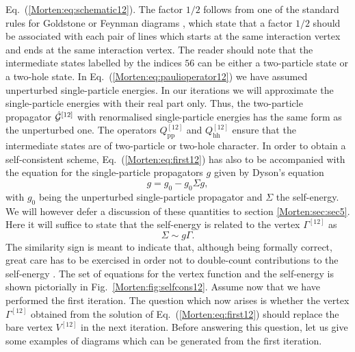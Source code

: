 Eq.~(\ref{Morten:eq:schematic12}).  The factor $1/2$ follows from one
of the standard rules for Goldstone or Feynman  
diagrams
\cite{Morten:kstop81}, which state that a factor $1/2$ should be
associated with each pair of lines which starts at the same
interaction vertex and ends at the same interaction vertex.  The
reader should note that the intermediate states labelled by the
indices $56$ can be either a two-particle state or a two-hole state.
In Eq.~(\ref{Morten:eq:paulioperator12}) we have assumed unperturbed
single-particle energies.  In our iterations we will approximate the
single-particle energies with their real part only. Thus, the
two-particle propagator $\hat{{\cal G}}^{[12]}$ with renormalised
single-particle energies has the same form as the unperturbed one.
The operators $Q^{[12]}_{\mathrm{pp}}$ and $Q^{[12]}_{\mathrm{hh}}$
ensure that the intermediate states are of two-particle or two-hole
character.  In order to obtain a self-consistent scheme,
Eq.~(\ref{Morten:eq:first12}) has also to be accompanied with the
equation for the single-particle propagators $g$ given by Dyson's
equation
\begin{equation}
    g=g_0-g_0\Sigma g,
    \label{Morten:eq:dyson12}
\end{equation}
with $g_0$ being the unperturbed single-particle 
propagator and $\Sigma$ the self-energy. We will however defer a discussion
of these quantities to section \ref{Morten:sec:sec5}. Here it will suffice to state
that  the self-energy is related to the vertex 
$\Gamma^{[12]}$ as 
\begin{equation}
      \Sigma \sim g\Gamma.
      \label{Morten:eq:sigma12}
\end{equation}
The similarity sign is meant to indicate that, although being formally
correct, great care has to be exercised in order not to double-count
contributions to the self-energy \cite{Morten:jls82}.  The set of
equations for the vertex function and the self-energy is shown
pictorially in Fig.~\ref{Morten:fig:selfcons12}.  Assume now that we
have performed the first iteration. The question which now arises is
whether the vertex $\Gamma^{[12]}$ obtained from the solution of
Eq.~(\ref{Morten:eq:first12}) should replace the bare vertex
$V^{[12]}$ in the next iteration. Before answering this question, let
us give some examples of diagrams which can be generated from the
first iteration.
